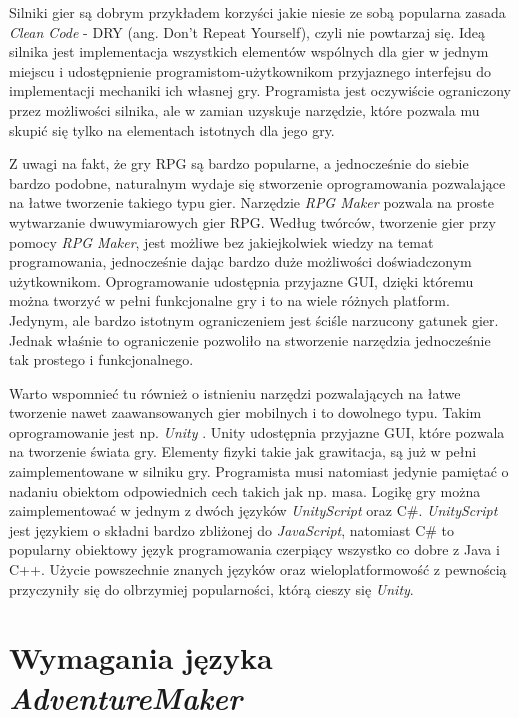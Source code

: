 \documentclass[openright]{xmgr}
\begin{document}
Silniki gier są dobrym przykładem korzyści jakie niesie ze sobą popularna zasada \textit{Clean Code} \cite{CleanCode:2005} - DRY (ang. Don't Repeat Yourself), czyli nie powtarzaj się. Ideą silnika jest implementacja wszystkich elementów wspólnych dla gier w jednym miejscu i udostępnienie programistom-użytkownikom przyjaznego interfejsu do implementacji mechaniki ich własnej gry. Programista jest oczywiście ograniczony przez możliwości silnika, ale w zamian uzyskuje narzędzie, które pozwala mu skupić się tylko na elementach istotnych dla jego gry.

Z uwagi na fakt, że gry RPG są bardzo popularne, a jednocześnie do siebie bardzo podobne, naturalnym wydaje się stworzenie oprogramowania pozwalające na łatwe tworzenie takiego typu gier. Narzędzie \textit{RPG Maker} \cite{RPGMaker:2017:Doc} pozwala na proste wytwarzanie dwuwymiarowych gier RPG. Według twórców, tworzenie gier przy pomocy \textit{RPG Maker}, jest możliwe bez jakiejkolwiek wiedzy na temat programowania, jednocześnie dając bardzo duże możliwości doświadczonym użytkownikom. Oprogramowanie udostępnia przyjazne GUI, dzięki któremu można tworzyć w pełni funkcjonalne gry i to na wiele różnych platform. Jedynym, ale bardzo istotnym ograniczeniem jest ściśle narzucony gatunek gier. Jednak właśnie to ograniczenie pozwoliło na stworzenie narzędzia jednocześnie tak prostego i funkcjonalnego. 

Warto wspomnieć tu również o istnieniu narzędzi pozwalających na łatwe tworzenie nawet zaawansowanych gier mobilnych i to dowolnego typu. Takim oprogramowanie jest np. \textit{Unity} \cite{Unity3D:2017:Doc}. Unity udostępnia przyjazne GUI, które pozwala na tworzenie świata gry. Elementy fizyki takie jak grawitacja, są już w pełni zaimplementowane w silniku gry. Programista musi natomiast jedynie pamiętać o nadaniu obiektom odpowiednich cech takich jak np. masa. Logikę gry można zaimplementować w jednym z dwóch języków \textit{UnityScript} oraz C\#. \textit{UnityScript} jest językiem o składni bardzo zbliżonej do \textit{JavaScript}, natomiast C\# to popularny obiektowy język programowania czerpiący wszystko co dobre z Java i C++. Użycie powszechnie znanych języków oraz wieloplatformowość z pewnością przyczyniły się do olbrzymiej popularności, którą cieszy się \textit{Unity}.


\chapter{Wymagania języka \textit{AdventureMaker}}
\end{document}
